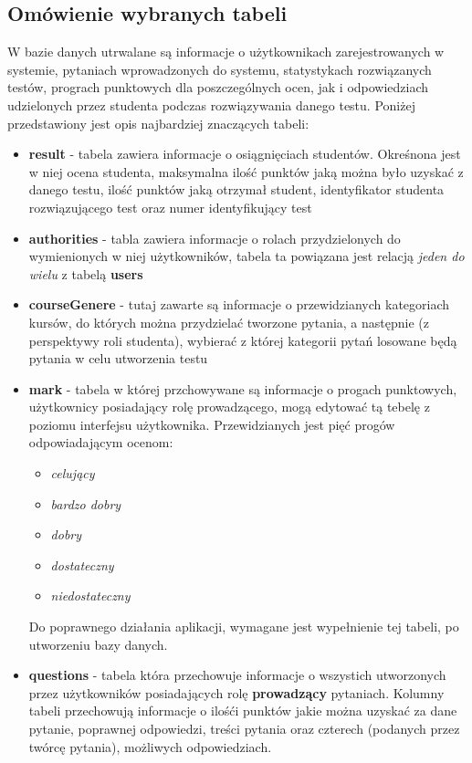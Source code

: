 \documentclass[a4paper, titlepage]{article}
\begin{document}
				\subsection{Omówienie wybranych tabeli}
				W bazie danych utrwalane są informacje o użytkownikach zarejestrowanych w systemie, pytaniach wprowadzonych do systemu, statystykach rozwiązanych testów, prograch punktowych dla poszczególnych ocen, jak i odpowiedziach udzielonych przez studenta podczas rozwiązywania danego testu. Poniżej przedstawiony jest opis najbardziej znaczących tabeli:
				\begin{itemize}
					\item \textbf{result} - tabela zawiera informacje o osiągnięciach studentów. Okreśnona jest w niej ocena studenta, maksymalna ilość punktów jaką można było uzyskać z danego testu, ilość punktów jaką otrzymał student, identyfikator studenta rozwiązującego test oraz numer identyfikujący test
                    \item \textbf{authorities} - tabla zawiera informacje o rolach przydzielonych do wymienionych w niej użytkowników, tabela ta powiązana jest relacją \textit{jeden do wielu} z tabelą \textbf{users}
                    \item \textbf{courseGenere} - tutaj zawarte są informacje o przewidzianych kategoriach kursów, do których można przydzielać tworzone pytania, a następnie (z perspektywy roli studenta), wybierać z której kategorii pytań losowane będą pytania w celu utworzenia testu
                    \item \textbf{mark} - tabela w której przchowywane są informacje o progach punktowych, użytkownicy posiadający rolę prowadzącego, mogą edytować tą tebelę z poziomu interfejsu użytkownika. Przewidzianych jest pięć progów odpowiadającym ocenom:
                    	\begin{itemize}
                        \item \textit{celujący}
                        \item \textit{bardzo dobry}
                        \item \textit{dobry}
                        \item \textit{dostateczny}
                        \item \textit{niedostateczny}
                        \end{itemize}
                    Do poprawnego działania aplikacji, wymagane jest wypełnienie tej tabeli, po utworzeniu bazy danych.
                    	\item \textbf{questions} - tabela która przechowuje informacje o wszystich utworzonych przez użytkowników posiadających rolę \textbf{prowadzący} pytaniach. Kolumny tabeli przechowują informacje o ilośći punktów jakie można uzyskać za dane pytanie, poprawnej odpowiedzi, treści pytania oraz czterech (podanych przez twórcę pytania), możliwych odpowiedziach. 

\end{itemize}
\end{document}
